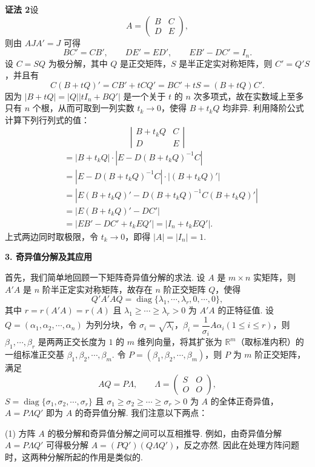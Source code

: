 \documentclass[UTF8, 12pt, fontset=fandol, oneside]{ctexart}
\begin{document}
\noindent\textbf{证法 2}\quad 设
\[
A=\begin{pmatrix}
B&C\\
D&E
\end{pmatrix},
\]
则由 $AJA'=J$ 可得
\[
BC'=CB',\qquad DE'=ED',\qquad EB'-DC'=I_n.
\]
设 $C=SQ$ 为极分解，其中 $Q$ 是正交矩阵，$S$ 是半正定实对称矩阵，则 $C'=Q'S$，并且有
\[
C(B+tQ)'=CB'+tCQ'=BC'+tS=(B+tQ)C'.
\]
因为 $|B+tQ|=|Q||tI_n+BQ'|$ 是一个关于 $t$ 的 $n$ 次多项式，故在实数域上至多只有 $n$ 个根，从而可取到一列实数 $t_k\to0$，使得 $B+t_kQ$ 均非异. 利用降阶公式计算下列行列式的值：
\[
\left|
\begin{matrix}
B+t_kQ&C\\
D&E
\end{matrix}
\right|
\]
\[
\begin{aligned}
&=|B+t_kQ|\cdot|E-D(B+t_kQ)^{-1}C|\\
&=|E-D(B+t_kQ)^{-1}C|\cdot|(B+t_kQ)'|\\
&=|E(B+t_kQ)'-D(B+t_kQ)^{-1}C(B+t_kQ)'|\\
&=|E(B+t_kQ)'-DC'|\\
&=|EB'-DC'+t_kEQ'|=|I_n+t_kEQ'|.
\end{aligned}
\]
上式两边同时取极限，令 $t_k\to0$，即得 $|A|=|I_n|=1$.

\noindent\textbf{3. 奇异值分解及其应用}

首先，我们简单地回顾一下矩阵奇异值分解的求法. 设 $A$ 是 $m\times n$ 实矩阵，则 $A'A$ 是 $n$ 阶半正定实对称矩阵，故存在 $n$ 阶正交矩阵 $Q$，使得
\[
Q'A'AQ=\operatorname{diag}\{\lambda_1,\cdots,\lambda_r,0,\cdots,0\},
\]
其中 $r=r(A'A)=r(A)$ 且 $\lambda_1\ge\cdots\ge\lambda_r>0$ 为 $A'A$ 的正特征值. 设 $Q=(\alpha_1,\alpha_2,\cdots,\alpha_n)$ 为列分块，令 $\sigma_i=\sqrt{\lambda_i}$，$\beta_i=\dfrac{1}{\sigma_i}A\alpha_i(1\le i\le r)$，则 $\beta_1,\cdots,\beta_r$ 是两两正交长度为 $1$ 的 $m$ 维列向量，将其扩张为 $\mathbb{R}^m$（取标准内积）的一组标准正交基 $\beta_1,\beta_2,\cdots,\beta_m$. 令 $P=(\beta_1,\beta_2,\cdots,\beta_m)$，则 $P$ 为 $m$ 阶正交矩阵，满足
\[
AQ=P\Lambda,\qquad
\Lambda=\begin{pmatrix}
S&O\\
O&O
\end{pmatrix},
\]
$S=\operatorname{diag}\{\sigma_1,\sigma_2,\cdots,\sigma_r\}$ 且 $\sigma_1\ge\sigma_2\ge\cdots\ge\sigma_r>0$ 为 $A$ 的全体正奇异值，$A=P\Lambda Q'$ 即为 $A$ 的奇异值分解. 我们注意以下两点：

(1) 方阵 $A$ 的极分解和奇异值分解之间可以互相推导. 例如，由奇异值分解 $A=P\Lambda Q'$ 可得极分解 $A=(PQ')(Q\Lambda Q')$，反之亦然. 因此在处理方阵问题时，这两种分解所起的作用是类似的.
\end{document}
